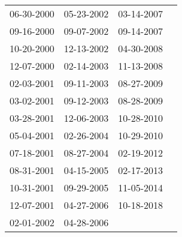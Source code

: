 \begin{supertabular}{llll}
 06-30-2000 &  05-23-2002 &  03-14-2007 \\
 09-16-2000 &  09-07-2002 &  09-14-2007 \\
 10-20-2000 &  12-13-2002 &  04-30-2008 \\
 12-07-2000 &  02-14-2003 &  11-13-2008 \\
 02-03-2001 &  09-11-2003 &  08-27-2009 \\
 03-02-2001 &  09-12-2003 &  08-28-2009 \\
 03-28-2001 &  12-06-2003 &  10-28-2010 \\
 05-04-2001 &  02-26-2004 &  10-29-2010 \\
 07-18-2001 &  08-27-2004 &  02-19-2012 \\
 08-31-2001 &  04-15-2005 &  02-17-2013 \\
 10-31-2001 &  09-29-2005 &  11-05-2014 \\
 12-07-2001 &  04-27-2006 &  10-18-2018 \\
 02-01-2002 &  04-28-2006 &             \\
\end{supertabular}
